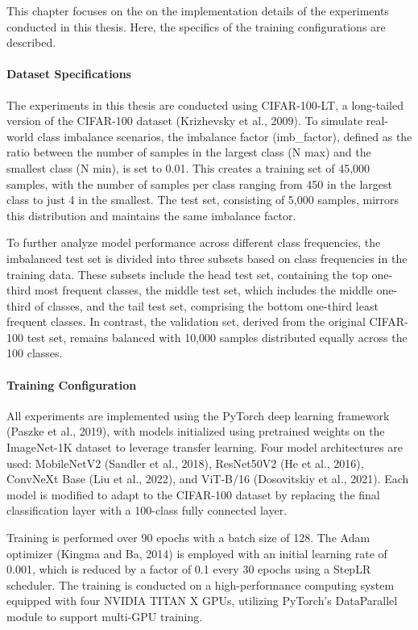 
This chapter focuses on the on the implementation details of the experiments conducted in this thesis. Here, the specifics of the training configurations are described. 

\paragraph{Dataset Specifications}
The experiments in this thesis are conducted using CIFAR-100-LT, a long-tailed version of the CIFAR-100 dataset (Krizhevsky et al., 2009). To simulate real-world class imbalance scenarios, the imbalance factor (imb\_factor), defined as the ratio between the number of samples in the largest class (N max) and the smallest class (N min), is set to 0.01. This creates a training set of 45,000 samples, with the number of samples per class ranging from 450 in the largest class to just 4 in the smallest. The test set, consisting of 5,000 samples, mirrors this distribution and maintains the same imbalance factor.

To further analyze model performance across different class frequencies, the imbalanced test set is divided into three subsets based on class frequencies in the training data. These subsets include the head test set, containing the top one-third most frequent classes, the middle test set, which includes the middle one-third of classes, and the tail test set, comprising the bottom one-third least frequent classes. In contrast, the validation set, derived from the original CIFAR-100 test set, remains balanced with 10,000 samples distributed equally across the 100 classes.

\paragraph{Training Configuration}
All experiments are implemented using the PyTorch deep learning framework (Paszke et al., 2019), with models initialized using pretrained weights on the ImageNet-1K dataset to leverage transfer learning. Four model architectures are used: MobileNetV2 (Sandler et al., 2018), ResNet50V2 (He et al., 2016), ConvNeXt Base (Liu et al., 2022), and ViT-B/16 (Dosovitskiy et al., 2021). Each model is modified to adapt to the CIFAR-100 dataset by replacing the final classification layer with a 100-class fully connected layer.

Training is performed over 90 epochs with a batch size of 128. The Adam optimizer (Kingma and Ba, 2014) is employed with an initial learning rate of 0.001, which is reduced by a factor of 0.1 every 30 epochs using a StepLR scheduler. The training is conducted on a high-performance computing system equipped with four NVIDIA TITAN X GPUs, utilizing PyTorch's DataParallel module to support multi-GPU training.

